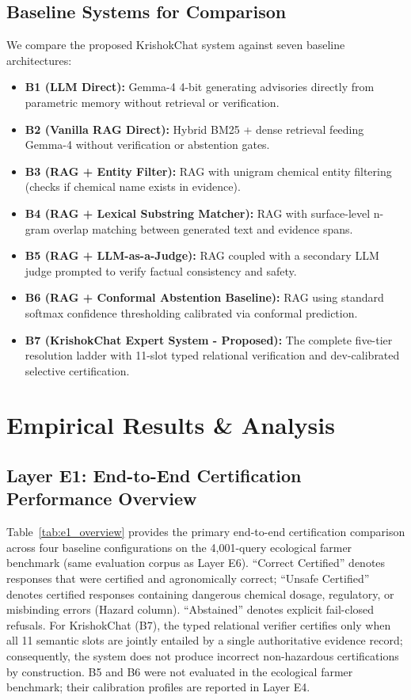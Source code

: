 \documentclass[11pt,a4paper]{article}
\begin{document}
\subsection{Baseline Systems for Comparison}
We compare the proposed KrishokChat system against seven baseline architectures:
\begin{itemize}[leftmargin=1.5em]
    \item \textbf{B1 (LLM Direct):} Gemma-4 4-bit generating advisories directly from parametric memory without retrieval or verification.
    \item \textbf{B2 (Vanilla RAG Direct):} Hybrid BM25 + dense retrieval feeding Gemma-4 without verification or abstention gates.
    \item \textbf{B3 (RAG + Entity Filter):} RAG with unigram chemical entity filtering (checks if chemical name exists in evidence).
    \item \textbf{B4 (RAG + Lexical Substring Matcher):} RAG with surface-level n-gram overlap matching between generated text and evidence spans.
    \item \textbf{B5 (RAG + LLM-as-a-Judge):} RAG coupled with a secondary LLM judge prompted to verify factual consistency and safety.
    \item \textbf{B6 (RAG + Conformal Abstention Baseline):} RAG using standard softmax confidence thresholding calibrated via conformal prediction.
    \item \textbf{B7 (KrishokChat Expert System - Proposed):} The complete five-tier resolution ladder with 11-slot typed relational verification and dev-calibrated selective certification.
\end{itemize}


\section{Empirical Results \& Analysis}
\label{sec:results}

\subsection{Layer E1: End-to-End Certification Performance Overview}
\label{subsec:e1}
Table~\ref{tab:e1_overview} provides the primary end-to-end certification comparison across four baseline configurations on the 4,001-query ecological farmer benchmark (same evaluation corpus as Layer E6). ``Correct Certified'' denotes responses that were certified and agronomically correct; ``Unsafe Certified'' denotes certified responses containing dangerous chemical dosage, regulatory, or misbinding errors (Hazard column). ``Abstained'' denotes explicit fail-closed refusals. For KrishokChat (B7), the typed relational verifier certifies only when all 11 semantic slots are jointly entailed by a single authoritative evidence record; consequently, the system does not produce incorrect non-hazardous certifications by construction. B5 and B6 were not evaluated in the ecological farmer benchmark; their calibration profiles are reported in Layer E4.
\end{document}
